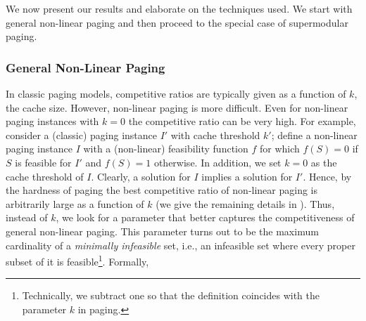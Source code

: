 \documentclass[11pt]{article}
\newcommand{\cP}{{\mathcal{P}}}
\begin{document}
We now present our results and elaborate on the techniques used. We start with general non-linear paging and then proceed to the special case of supermodular paging.

\subsubsection{General Non-Linear Paging}
\label{sec:ell}

In classic paging models, competitive ratios are typically given as a function of $k$, the cache size.  However, non-linear paging is more difficult. Even for non-linear paging instances with $k = 0$ the competitive ratio can be very high. For example, consider a (classic) paging instance $I'$ with cache threshold $k'$; define a non-linear paging instance $I$ with a (non-linear) feasibility function $f$ for which $f(S) = 0$ if $S$ is feasible for $I'$ and $f(S) = 1$ otherwise. In addition, we set $k = 0$ as the cache threshold of $I$. Clearly, a solution for $I$ implies a solution for $I'$. 
 Hence, by the hardness of paging \cite{sleator1985amortized,fiat1991competitive} the best competitive ratio of non-linear paging is arbitrarily large as a function of $k$ (we give the remaining details in ). %
Thus, instead of $k$, we look for a parameter that better captures the competitiveness of general non-linear paging.
This parameter turns out to be the maximum cardinality of a {\em minimally infeasible} set, i.e., an infeasible set where every proper subset of it is feasible\footnote{Technically, we subtract one so that the definition coincides with the parameter $k$ in paging.}. Formally, %
\end{document}
